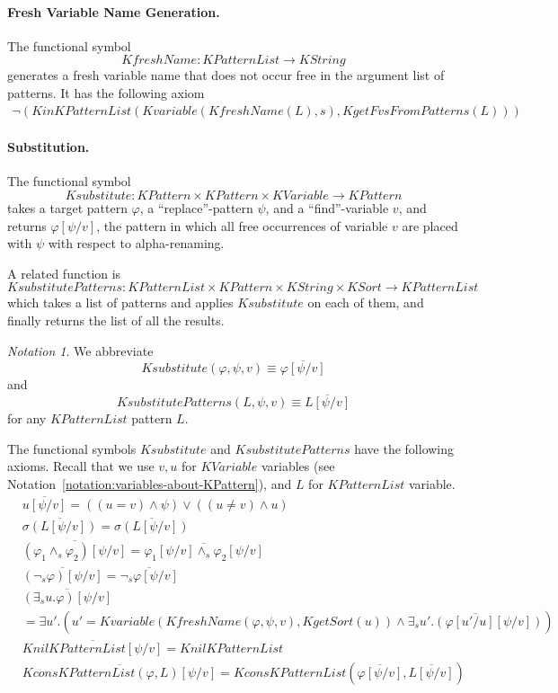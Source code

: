 \documentclass[UTF8,11pt]{article}
\newcounter{thmcounter}
\theoremstyle{plain}
\theoremstyle{definition}
\theoremstyle{remark}
\newtheorem{notation}   [thmcounter]{Notation}
\newcommand{\KString}{\mathit{KString}}
\newcommand{\KSort}{\mathit{KSort}}
\newcommand{\KPatternList}{\mathit{KPatternList}}
\newcommand{\KnilKPatternList}{\mathit{KnilKPatternList}}
\newcommand{\KconsKPatternList}{\mathit{KconsKPatternList}}
\newcommand{\KinKPatternList}{\mathit{KinKPatternList}}
\newcommand{\KVariable}{\mathit{KVariable}}
\newcommand{\KPattern}{\mathit{KPattern}}
\newcommand{\Kvariable}{\mathit{Kvariable}}
\newcommand{\KgetFvsFromPatterns}{\mathit{KgetFvsFromPatterns}}
\newcommand{\KfreshName}{\mathit{KfreshName}}
\newcommand{\KgetSort}{\mathit{KgetSort}}
\newcommand{\Ksubstitute}{\mathit{Ksubstitute}}
\newcommand{\KsubstitutePatterns}{\mathit{KsubstitutePatterns}}
\begin{document}
\paragraph{Fresh Variable Name Generation.}
The functional symbol
$$\KfreshName \colon \KPatternList \to \KString$$ 
generates a fresh variable name that does not occur free in the argument list of patterns.
It has the following axiom
\begin{align*}
\neg(\KinKPatternList(\Kvariable(\KfreshName(L), s), \KgetFvsFromPatterns(L)))
\end{align*}

\paragraph{Substitution.}
The functional symbol
$$\Ksubstitute \colon \KPattern \times \KPattern \times \KVariable \to 
\KPattern$$
takes a target pattern $\varphi$, a ``replace''-pattern $\psi$, and a 
``find''-variable $v$, and returns $\varphi[\psi / v]$, the pattern in 
which all free occurrences of variable $v$ are placed with $\psi$
with respect to alpha-renaming.

A related function is 
$$\KsubstitutePatterns \colon \KPatternList \times \KPattern \times \KString \times \KSort \to \KPatternList$$
which takes a list of patterns and applies $\Ksubstitute$ on each of them, and finally returns the list of all the results.

\begin{notation}
	We abbreviate 
	$$\Ksubstitute(\varphi, \psi, v) \equiv \overline{\varphi[\psi / v]}$$
	and 
	$$\KsubstitutePatterns(L, \psi, v) \equiv 
	\overline{L[\psi / v]}$$
	for any $\KPatternList$ pattern $L$.
\end{notation}

The functional symbols $\Ksubstitute$ and $\KsubstitutePatterns$ have the 
following axioms. Recall that we use $v, u$ for $\KVariable$ variables (see 
Notation~\ref{notation:variables-about-KPattern}), and $L$ for $\KPatternList$ 
variable. 
\begin{align*}
  & \overline{u [\psi / v]} 
  = ((u = v) \wedge \psi)
  \vee ((u \neq v) \wedge u)
  \\
  & \overline{\sigma(L [\psi / v])} = 
  \overline{\sigma(L[\psi / v])}
  \\
  & \overline{(\varphi_1 \wedge_{s} \varphi_2) [\psi / v]} = 
  \overline{\varphi_1[\psi / v] \wedge_{s} \varphi_2[\psi / v]}
  \\
  & \overline{(\neg_{s} \varphi)[\psi / v]} = \overline{\neg_{s} \varphi[\psi 
  / v]}
  \\
  & \overline{(\exists_s u . \varphi)[\psi/v]} \\
  & = \exists u' . \left(u' = \Kvariable(\KfreshName(\varphi, \psi, v), 
  \KgetSort(u)) 
  \wedge \overline{\exists_s u' . (\varphi[u' / u][\psi/v])}\right)
  \\
  & \overline{\KnilKPatternList[\psi / v]} = \KnilKPatternList
  \\
  & \overline{\KconsKPatternList(\varphi, L)[\psi / v]} = 
  \KconsKPatternList(\overline{\varphi[\psi / v]}, \overline{L[\psi / v]})
\end{align*}
\end{document}

